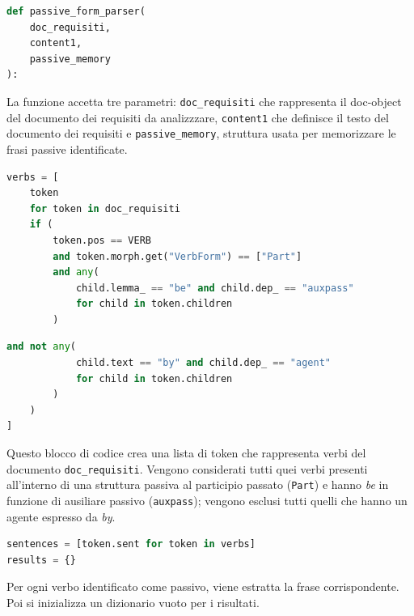 \documentclass[12pt]{report}
\begin{document}
\begin{mdframed}
\small
\begin{lstlisting}[language=Python]
def passive_form_parser(
    doc_requisiti,
    content1,
    passive_memory
):
\end{lstlisting}
\end{mdframed}

\noindent La funzione accetta tre parametri: \texttt{doc\_requisiti} che rappresenta il doc-object del documento dei requisiti da analizzzare, \texttt{content1} che definisce il testo del documento dei requisiti e \texttt{passive\_memory}, struttura usata per memorizzare le frasi passive identificate.


\begin{mdframed}
\small
\begin{lstlisting}[language=Python]
verbs = [
    token
    for token in doc_requisiti
    if (
        token.pos == VERB
        and token.morph.get("VerbForm") == ["Part"]
        and any(
            child.lemma_ == "be" and child.dep_ == "auxpass"
            for child in token.children
        )
\end{lstlisting}
\end{mdframed}


\begin{mdframed}
\small
\begin{lstlisting}[language=Python]
        and not any(
            child.text == "by" and child.dep_ == "agent"
            for child in token.children
        )
    )
]
\end{lstlisting}
\end{mdframed}

\noindent Questo blocco di codice crea una lista di token che rappresenta verbi del documento \texttt{doc\_requisiti}. Vengono considerati tutti quei verbi presenti all'interno di una struttura passiva al participio passato (\texttt{Part}) e hanno \textit{be} in funzione di ausiliare passivo (\texttt{auxpass}); vengono esclusi tutti quelli che hanno un agente espresso da \textit{by}.


\begin{mdframed}
\small
\begin{lstlisting}[language=Python]
sentences = [token.sent for token in verbs]
results = {}
\end{lstlisting}
\end{mdframed}

\noindent Per ogni verbo identificato come passivo, viene estratta la frase corrispondente. Poi si inizializza un dizionario vuoto per i risultati.
\end{document}
